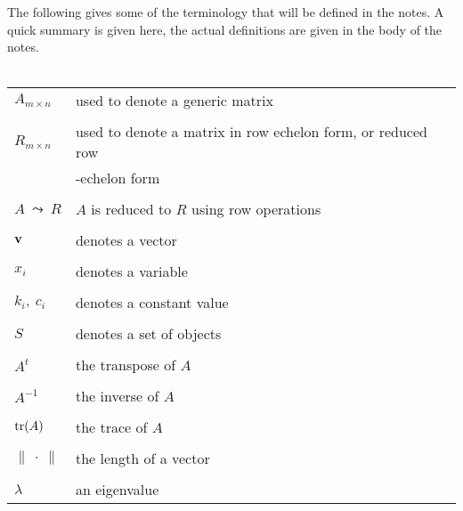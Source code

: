 \newpage
The following gives some of the terminology that will be defined
in the notes. A quick summary is given here, the actual
definitions are given in the body of the notes.
\\
\\
{\tabcolsep=5mm
\begin{tabular}{ll}

  $A_{m \times n}$ & used to denote a generic matrix \\
   &  \\
  $R_{m \times n}$ & used to denote a matrix in row echelon form, or reduced row\\
  &-echelon form \\
   &  \\
  $ A  \ \leadsto  \ R$ & $A$ is reduced to $R$ using row operations \\
   &  \\
  ${\bf v}$ & denotes a vector \\
   &  \\
  $x_i$ & denotes a variable \\
   &  \\
  $k_i, \ c_i $ & denotes a constant value \\
   &  \\
  $S$ & denotes a set of objects \\
   &  \\
  $A^t$ & the transpose of $A$ \\
   &  \\
  $ A^{-1}$ & the inverse of $A$ \\
   &  \\
  $ {\rm tr}(A)$ & the trace of $A$ \\
   &  \\
  $ \| \ \cdot \ \| $ & the length of a vector \\
   &  \\
  $ \lambda$ & an eigenvalue \\

\end{tabular}
} 
\newpage